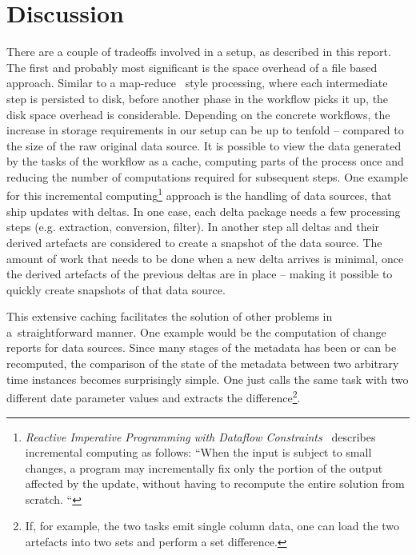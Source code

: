 \documentclass[english]{lni}
\begin{document}
\section{Discussion}
\label{discussion}

There are a couple of tradeoffs involved in a setup, as described in this
report. The first and probably most significant is the space overhead
of a file based approach. Similar to a map-reduce~\cite{dean2008mapreduce} style processing, where
each intermediate step is persisted to disk, before another phase in the
workflow picks it up, the disk space overhead is considerable. Depending
on the concrete workflows, the increase in storage requirements in our
setup can be up to tenfold -- compared to the size of the raw original data
source. It is possible to view the data generated by the tasks of the workflow
as a cache, computing parts of the process once and reducing the number
of computations required for subsequent steps. One example for this incremental
computing\footnote{\emph{Reactive Imperative Programming with Dataflow Constraints}~\cite{demetrescu2011reactive}
describes incremental computing as follows: ``When the input is subject to small changes,
a program may incrementally fix only the portion of the output affected by the update, without having to recompute the
entire solution from scratch. ``} approach is the handling of data sources, that ship updates with deltas.
In one case, each delta package needs a few processing steps (e.g. extraction,
conversion, filter). In another step all deltas and their derived artefacts
are considered to create a snapshot of the data source. The amount of work
that needs to be done when a new delta arrives is minimal, once the derived artefacts
of the previous deltas are in place -- making it possible to quickly
create snapshots of that data source.

This extensive caching facilitates the solution of other problems in a~straightforward manner. One example would be the computation of change
reports for data sources. Since many stages of the metadata has been or
can be recomputed, the comparison of the state of the metadata between
two arbitrary time instances becomes surprisingly simple. One just calls
the same task with two different date parameter values and extracts the difference\footnote{If,
for example, the two tasks emit single column data, one can load the two artefacts
into two sets and perform a set difference.}.
\end{document}

